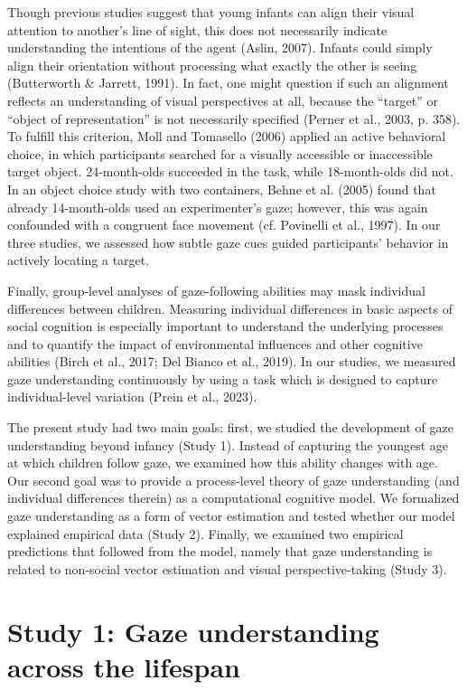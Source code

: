 \documentclass[
  man,mask,floatsintext]{apa7}
\begin{document}
Though previous studies suggest that young infants can align their visual attention to another's line of sight, this does not necessarily indicate understanding the intentions of the agent (Aslin, 2007). Infants could simply align their orientation without processing what exactly the other is seeing (Butterworth \& Jarrett, 1991). In fact, one might question if such an alignment reflects an understanding of visual perspectives at all, because the ``target'' or ``object of representation'' is not necessarily specified (Perner et al., 2003, p. 358). To fulfill this criterion, Moll and Tomasello (2006) applied an active behavioral choice, in which participants searched for a visually accessible or inaccessible target object. 24-month-olds succeeded in the task, while 18-month-olds did not. In an object choice study with two containers, Behne et al. (2005) found that already 14-month-olds used an experimenter's gaze; however, this was again confounded with a congruent face movement (cf. Povinelli et al., 1997). In our three studies, we assessed how subtle gaze cues guided participants' behavior in actively locating a target.

Finally, group-level analyses of gaze-following abilities may mask individual differences between children. Measuring individual differences in basic aspects of social cognition is especially important to understand the underlying processes and to quantify the impact of environmental influences and other cognitive abilities (Birch et al., 2017; Del Bianco et al., 2019). In our studies, we measured gaze understanding continuously by using a task which is designed to capture individual-level variation (Prein et al., 2023).

The present study had two main goals: first, we studied the development of gaze understanding beyond infancy (Study 1). Instead of capturing the youngest age at which children follow gaze, we examined how this ability changes with age. Our second goal was to provide a process-level theory of gaze understanding (and individual differences therein) as a computational cognitive model. We formalized gaze understanding as a form of vector estimation and tested whether our model explained empirical data (Study 2). Finally, we examined two empirical predictions that followed from the model, namely that gaze understanding is related to non-social vector estimation and visual perspective-taking (Study 3).

\hypertarget{study-1-gaze-understanding-across-the-lifespan}{%
\section{Study 1: Gaze understanding across the lifespan}\label{study-1-gaze-understanding-across-the-lifespan}}
\end{document}
